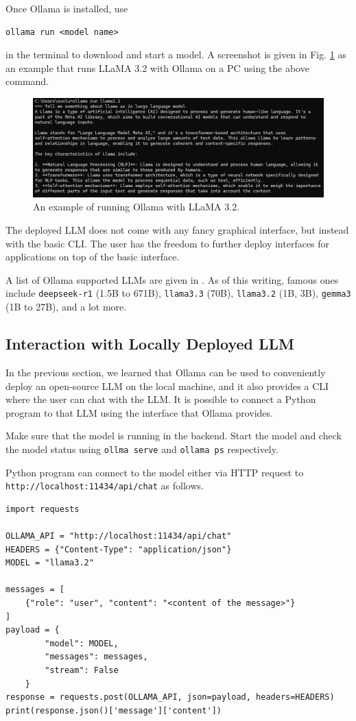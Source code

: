 Once Ollama is installed, use
\begin{lstlisting}
ollama run <model name>
\end{lstlisting}
in the terminal to download and start a model. A screenshot is given in Fig. \ref{fig:ollama_llama32} as an example that runs LLaMA 3.2 with Ollama on a PC using the above command.

\begin{figure}[!htb]
	\centering
	\includegraphics[width=\textwidth]{./chapters/part-7/figures/ollama_llama32.png}
	\caption{An example of running Ollama with LLaMA 3.2.}
	\label{fig:ollama_llama32}
\end{figure}

The deployed LLM does not come with any fancy graphical interface, but instead with the basic CLI. The user has the freedom to further deploy interfaces for applications on top of the basic interface. 

A list of Ollama supported LLMs are given in \cite{ollama2025library}. As of this writing, famous ones include \verb|deepseek-r1| (1.5B to 671B), \verb|llama3.3| (70B), \verb|llama3.2| (1B, 3B), \verb|gemma3| (1B to 27B), and a lot more. 

\subsection{Interaction with Locally Deployed LLM}

In the previous section, we learned that Ollama can be used to conveniently deploy an open-source LLM on the local machine, and it also provides a CLI where the user can chat with the LLM. It is possible to connect a Python program to that LLM using the interface that Ollama provides.

Make sure that the model is running in the backend. Start the model and check the model status using \verb|ollma serve| and \verb|ollama ps| respectively.

Python program can connect to the model either via HTTP request to \verb|http://localhost:11434/api/chat| as follows.
\begin{lstlisting}
import requests

OLLAMA_API = "http://localhost:11434/api/chat"
HEADERS = {"Content-Type": "application/json"}
MODEL = "llama3.2"

messages = [
    {"role": "user", "content": "<content of the message>"}
]
payload = {
        "model": MODEL,
        "messages": messages,
        "stream": False
    }
response = requests.post(OLLAMA_API, json=payload, headers=HEADERS)
print(response.json()['message']['content'])
\end{lstlisting}

